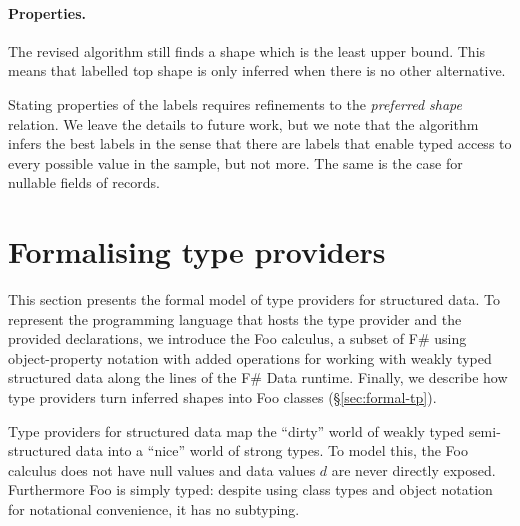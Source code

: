 \documentclass[10pt,preprint,blind,clearpagebib]{sigplanconf}
\newcommand{\kvd}[1]{\textnormal{\textcolor{kvdclr}{\sffamily #1}}}
\begin{document}
\paragraph{Properties.}
The revised algorithm still finds a shape which is the least upper bound. This means that 
labelled top shape is only inferred when there is no other alternative.

Stating properties of the labels requires refinements to the \emph{preferred shape} relation.
We leave the details to future work, but we
note that the algorithm infers the best labels in the sense that there are labels that enable 
typed access to every possible value in the sample, but not more. The same is the case for nullable
fields of records.


% 
%

\section{Formalising type providers}
\label{sec:formal}

This section presents the formal model of type providers for structured data. 
To represent the programming language that hosts the type provider and the
provided declarations, we introduce the Foo calculus,
a subset of F\# using object-property notation with
added operations for working with weakly typed structured data along the lines of the F\# Data runtime. Finally, we describe how 
type providers turn inferred shapes into Foo classes (\S\ref{sec:formal-tp}).

Type providers for structured data map the ``dirty'' world of weakly typed 
semi-structured data into a ``nice'' world of strong types. To model this, the Foo calculus
does not have \kvd{null} values and data values $d$ are never directly exposed.  
Furthermore Foo is simply typed: despite using class types and object notation 
for notational convenience, it has no subtyping.
\end{document}
